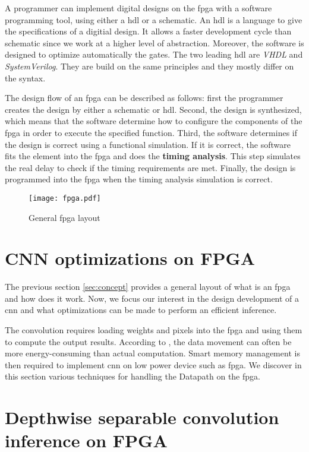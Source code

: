 A programmer can implement digital designs on the \acrshort{fpga} with a software programming tool, using either a \acrfull{hdl} or a schematic. An \acrshort{hdl} is a language to give the specifications of a digitial design. It allows a faster development cycle than schematic since we work at a higher level of abstraction. Moreover, the software is designed to optimize automatically the gates. The two leading \acrshort{hdl} are \textit{VHDL} and \textit{SystemVerilog}. They are build on the same principles and they mostly differ on the syntax.

The design flow of an \acrshort{fpga} can be described as follows: first the programmer creates the design by either a schematic or \acrshort{hdl}. Second, the design is synthesized, which means that the software determine how to configure the components of the \acrshort{fpga} in order to execute the specified function. Third, the software determines if the design is correct using a functional simulation. If it is correct, the software fits the element into the \acrshort{fpga} and does the \textbf{timing analysis}. This step simulates the real delay to check if the timing requirements are met. Finally, the design is programmed into the \acrshort{fpga} when the timing analysis simulation is correct.

\begin{figure}
    \texttt{[image: fpga.pdf]}
    \caption{General \acrshort{fpga} layout \cite{harris_digital_2015}}
    \label{fig:fpga}
\end{figure}
%
%
\section{CNN optimizations on FPGA} \label{sec:opti_dataflow}
%
%
The previous section \ref{sec:concept} provides a general layout of what is an \acrshort{fpga} and how does it work. Now, we focus our interest in the design development of a \acrshort{cnn} and what optimizations can be made to perform an efficient inference.

The convolution requires loading weights and pixels into the \acrshort{fpga} and using them to compute the output results. According to \textcite{chen_eyeriss_2017}, the data movement can often be more energy-consuming than actual computation. Smart memory management is then required to implement \acrshort{cnn} on low power device such as \acrshort{fpga}. We discover in this section various techniques for handling the Datapath on the \acrshort{fpga}.
%

%
%
\section{Depthwise separable convolution inference on FPGA} \label{sec:inf_fpga}
%
%


